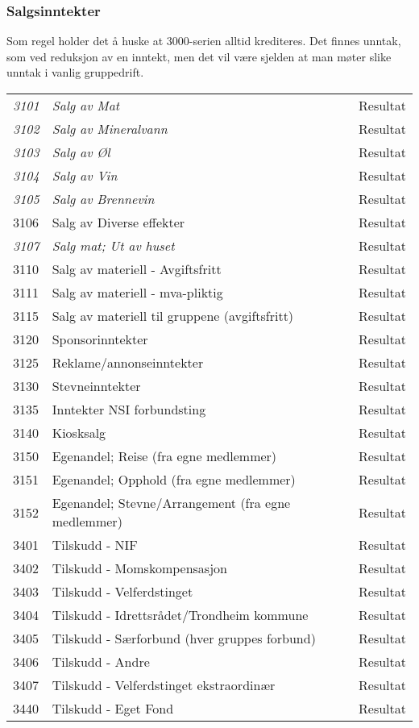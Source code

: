 \subsubsection*{Salgsinntekter}
Som regel holder det å huske at 3000-serien alltid krediteres. Det finnes unntak, som ved reduksjon av en inntekt, men det vil være sjelden at man møter slike unntak i vanlig gruppedrift.

\begin{table}[H]
	\begin{tabular}{l l l }
\emph{3101} & \emph{Salg av Mat} & Resultat\\
\emph{3102} & \emph{Salg av Mineralvann} & Resultat\\
\emph{3103} & \emph{Salg av Øl} & Resultat\\
\emph{3104} & \emph{Salg av Vin} & Resultat\\
\emph{3105} & \emph{Salg av Brennevin} & Resultat\\
3106 & Salg av Diverse effekter & Resultat\\
\emph{3107} & \emph{Salg mat; Ut av huset} & Resultat\\
3110 & Salg av materiell - Avgiftsfritt & Resultat\\
3111 & Salg av materiell - mva-pliktig & Resultat\\
3115 & Salg av materiell til gruppene (avgiftsfritt) & Resultat\\
3120 & Sponsorinntekter & Resultat\\
3125 & Reklame/annonseinntekter & Resultat\\
3130 & Stevneinntekter & Resultat\\
3135 & Inntekter NSI forbundsting & Resultat\\
3140 & Kiosksalg & Resultat\\
3150 & Egenandel; Reise (fra egne medlemmer) & Resultat\\
3151 & Egenandel; Opphold (fra egne medlemmer) & Resultat\\
3152 & Egenandel; Stevne/Arrangement (fra egne medlemmer) & Resultat\\
3401 & Tilskudd - NIF & Resultat\\
3402 & Tilskudd - Momskompensasjon & Resultat\\
3403 & Tilskudd - Velferdstinget & Resultat\\
3404 & Tilskudd - Idrettsrådet/Trondheim kommune & Resultat\\
3405 & Tilskudd - Særforbund (hver gruppes forbund) & Resultat\\
3406 & Tilskudd - Andre & Resultat\\
3407 & Tilskudd - Velferdstinget ekstraordinær & Resultat\\
3440 & Tilskudd - Eget Fond & Resultat\\
	\end{tabular}
\end{table}


